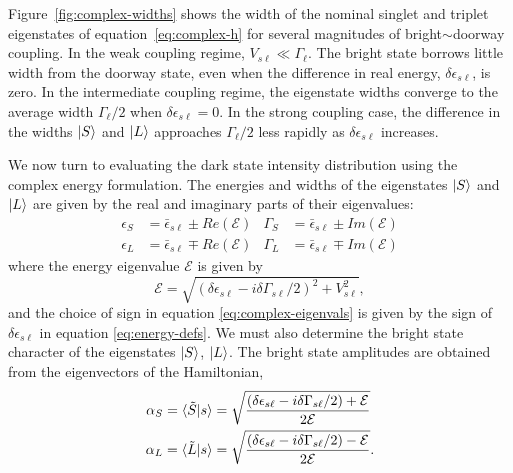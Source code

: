 \documentclass[12pt]{mitthesis}
\begin{document}
Figure~\ref{fig:complex-widths} shows the width of the nominal singlet
and triplet eigenstates of equation~\ref{eq:complex-h} for several
magnitudes of bright$\sim$doorway coupling.  In the weak coupling
regime, $V_{s\ell} \ll \Gamma_{\ell}$. The bright state borrows little
width from the doorway state, even when the difference in real energy,
$\delta \epsilon_{s\ell}$, is zero. In the intermediate coupling
regime, the eigenstate widths converge to the average width
$\Gamma_{\ell}/2$ when $\delta \epsilon_{s\ell} = 0$. In the strong
coupling case, the difference in the widths $\mathinner{|{S}\rangle}$ and $\mathinner{|{L}\rangle}$
approaches $\Gamma_{\ell} / 2$ less rapidly as $\delta
\epsilon_{s\ell}$ increases.

We now turn to evaluating the dark state intensity distribution using
the complex energy formulation.  The energies and widths of the
eigenstates $\mathinner{|{S}\rangle}$ and $\mathinner{|{L}\rangle}$ are given by the real and
imaginary parts of their eigenvalues:
\begin{subequations}
  \label{eq:complex-eigenvals}
  \begin{align}
    \epsilon_{S}& = 
      \bar{\epsilon}_{s \ell} \pm Re \left ( \mathcal{E} \right ) &
    \Gamma_{S}& = 
      \bar{\epsilon}_{s \ell} \pm Im \left ( \mathcal{E} \right ) \\
    \epsilon_{L}& = 
      \bar{\epsilon}_{s \ell} \mp Re \left ( \mathcal{E} \right ) &
    \Gamma_{L}& = 
      \bar{\epsilon}_{s \ell} \mp Im \left ( \mathcal{E} \right )
  \end{align}
\end{subequations}
where the energy eigenvalue $\mathcal{E}$ is given by
\begin{equation}
     \mathcal{E} = \sqrt{(\delta \epsilon_{s\ell} - i \delta \Gamma_{s\ell} / 2)^2 
       + V_{s\ell}^2},
\end{equation}
and the choice of sign in equation \ref{eq:complex-eigenvals} is given
by the sign of $\delta \epsilon_{s \ell}$ in equation
\ref{eq:energy-defs}.  We must also determine the bright state
character of the eigenstates $\mathinner{|{S}\rangle}$, $\mathinner{|{L}\rangle}$.  The bright state
amplitudes are obtained from the eigenvectors of the Hamiltonian,
\begin{subequations}
  \begin{align}
    \alpha_S =
    \mathinner{\langle{\tilde{S}|s}\rangle}& = 
     \sqrt{\frac
       {(\delta \epsilon_{s\ell} - i \delta \Gamma_{s\ell}/2) + \mathcal{E}}
       {2 \mathcal{E}}} \\
     \alpha_L =
     \mathinner{\langle{\tilde{L}|s}\rangle}& = 
     \sqrt{\frac
       {(\delta \epsilon_{s\ell} - i \delta \Gamma_{s\ell}/2) - \mathcal{E}}
       {2 \mathcal{E}}}.
   \end{align}
\end{subequations}
\end{document}
